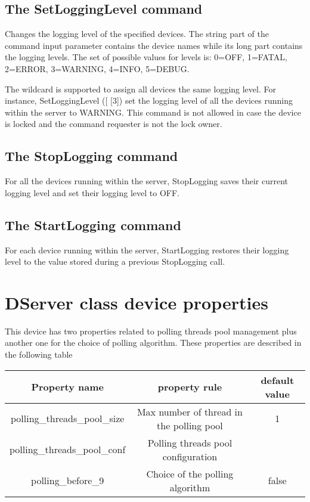\subsection{The SetLoggingLevel command}

Changes the logging level of the specified devices. The string part
of the command input parameter contains the device names while its
long part contains the logging levels. The set of possible values
for levels is: 0=OFF, 1=FATAL, 2=ERROR, 3=WARNING, 4=INFO, 5=DEBUG. 

The wildcard \textquotedbl{}{*}\textquotedbl{} is supported to assign
all devices the same logging level. For instance, SetLoggingLevel
({[}\textquotedbl{}{*}\textquotedbl{}{]} {[}3{]}) set the logging
level of all the devices running within the server to WARNING. This
command is not allowed in case the device is locked and the command
requester is not the lock owner.

\subsection{The StopLogging command}

For all the devices running within the server, StopLogging saves their
current logging level and set their logging level to OFF. 

\subsection{The StartLogging command}

For each device running within the server, StartLogging restores their
logging level to the value stored during a previous StopLogging call.

\section{DServer class device properties}

This device has two properties related to polling threads pool management
plus another one for the choice of polling algorithm. These properties
are described in the following table 

\vspace{0.3cm}

\begin{center}
\begin{longtable}{|c|c|c|}
\hline 
Property name & property rule & default value\tabularnewline
\hline 
\hline 
polling\_threads\_pool\_size & Max number of thread in the polling pool & 1\tabularnewline
\hline 
polling\_threads\_pool\_conf & Polling threads pool configuration & \tabularnewline
\hline 
polling\_before\_9 & Choice of the polling algorithm & false\tabularnewline
\hline 
\end{longtable}
\par\end{center}

